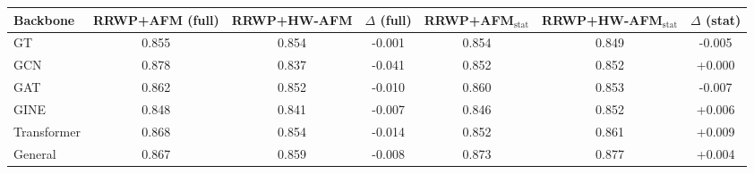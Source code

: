 \begin{tabular}{l c c c c c c}
\toprule
Backbone & RRWP+AFM (full) & RRWP+HW-AFM & $\Delta$ (full) & RRWP+AFM$_{\text{stat}}$ & RRWP+HW-AFM$_{\text{stat}}$ & $\Delta$ (stat) \\
\midrule
GT & 0.855 & 0.854 & -0.001 & 0.854 & 0.849 & -0.005 \\
GCN & 0.878 & 0.837 & -0.041 & 0.852 & 0.852 & +0.000 \\
GAT & 0.862 & 0.852 & -0.010 & 0.860 & 0.853 & -0.007 \\
GINE & 0.848 & 0.841 & -0.007 & 0.846 & 0.852 & +0.006 \\
Transformer & 0.868 & 0.854 & -0.014 & 0.852 & 0.861 & +0.009 \\
General & 0.867 & 0.859 & -0.008 & 0.873 & 0.877 & +0.004 \\
\bottomrule
\end{tabular}
